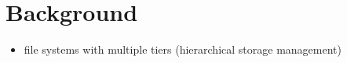 \section*{Background}
\begin{itemize}
\item file systems with multiple tiers (hierarchical storage management)
\end{itemize}

